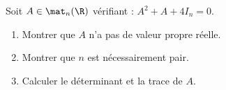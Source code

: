 \begin{enonce}
\begin{exercise}[ID={RMS 121-2 E1073 Autres écoles PSI},subtitle={},tags={}, difficulty={0}]
  Soit $A\in\mat_n(\R)$ vérifiant : $A^2+A+4I_n=0$.
  \begin{enumerate}
    \item Montrer que $A$ n'a pas de valeur propre réelle.
    \item Montrer que $n$ est nécessairement pair.
    \item Calculer le déterminant et la trace de $A$.
  \end{enumerate}
\end{exercise}
\begin{solution}
\end{solution}
\end{enonce}
